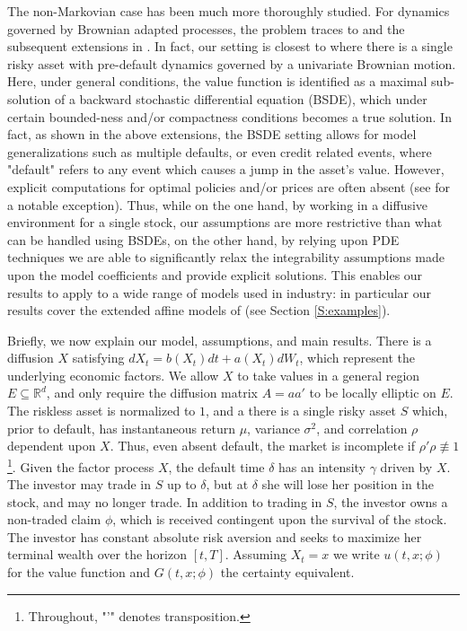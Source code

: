 \documentclass[11pt, letterpaper]{amsart}
\theoremstyle{definition}
\theoremstyle{remark}
\numberwithin{equation}{section}
\newcommand{\reals}{\mathbb R}
\begin{document}
The non-Markovian case has been much more thoroughly studied. For dynamics governed by Brownian adapted processes, the problem traces to \cite{MR2489997, MR2827466,MR3378038} and the subsequent extensions in \cite{MR2863640, MR3059266,MR3412158,MR3310349}.  In fact, our setting is closest to \cite[Sections 2,3]{MR2827466} where there is a single risky asset with pre-default dynamics governed by a univariate Brownian motion. Here, under general conditions, the value function is identified as a maximal sub-solution of a backward stochastic differential equation (BSDE), which under certain bounded-ness and/or compactness conditions becomes a true solution.  In fact, as shown in the above extensions, the BSDE setting allows for model generalizations such as multiple defaults, or even credit related events, where "default" refers to any event which causes a jump in the asset's value. However, explicit computations for optimal policies and/or prices are often absent (see \cite[Section 4.3]{MR2863640} for a notable exception). Thus, while on the one hand, by working in a diffusive environment for a single stock, our assumptions are more restrictive than what can be handled using BSDEs, on the other hand, by relying upon PDE techniques we are able to significantly relax the integrability assumptions made upon the model coefficients and provide explicit solutions.  This enables our results to apply to a wide range of models used in industry: in particular our results cover the extended affine models of \cite{dai2000saa,MR1994043,filipovic2001general} (see Section \ref{S:examples}).

Briefly, we now explain our model, assumptions, and main results.  There is a diffusion $X$ satisfying $dX_t = b(X_t)dt + a(X_t)dW_t$, which represent the underlying economic factors.  We allow $X$ to take values in a general region $E\subseteq\reals^d$, and only require the diffusion matrix $A = aa'$ to be locally elliptic on $E$. The riskless asset is normalized to $1$, and a there is a single risky asset $S$ which, prior to default, has instantaneous return $\mu$, variance $\sigma^2$, and correlation $\rho$ dependent upon $X$. Thus, even absent default, the market is incomplete if $\rho'\rho \not\equiv 1$\footnote{Throughout, "'" denotes transposition.}.  Given the factor process $X$, the default time $\delta$ has an intensity $\gamma$ driven by $X$.  The investor may trade in $S$ up to $\delta$, but at $\delta$ she will lose her position in the stock, and may no longer trade. In addition to trading in $S$, the investor owns a non-traded claim $\phi$, which is received contingent upon the survival of the stock. The investor has constant absolute risk aversion and seeks to maximize her terminal wealth over the horizon $[t,T]$.  Assuming $X_t = x$ we write $u(t,x;\phi)$ for the value function and $G(t,x;\phi)$ the certainty equivalent.
\end{document}
